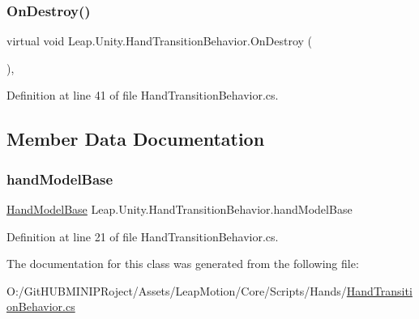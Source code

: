 \subsubsection{\texorpdfstring{OnDestroy()}{OnDestroy()}}
{\footnotesize\ttfamily virtual void Leap.\+Unity.\+Hand\+Transition\+Behavior.\+On\+Destroy (\begin{DoxyParamCaption}{ }\end{DoxyParamCaption})\hspace{0.3cm}{\ttfamily [protected]}, {\ttfamily [virtual]}}



Definition at line 41 of file Hand\+Transition\+Behavior.\+cs.



\subsection{Member Data Documentation}
\mbox{\label{class_leap_1_1_unity_1_1_hand_transition_behavior_aac308aa982a599388816ddc2d868c56e}} 
\subsubsection{\texorpdfstring{handModelBase}{handModelBase}}
{\footnotesize\ttfamily \mbox{\hyperlink{class_leap_1_1_unity_1_1_hand_model_base}{Hand\+Model\+Base}} Leap.\+Unity.\+Hand\+Transition\+Behavior.\+hand\+Model\+Base\hspace{0.3cm}{\ttfamily [protected]}}



Definition at line 21 of file Hand\+Transition\+Behavior.\+cs.



The documentation for this class was generated from the following file\+:\begin{DoxyCompactItemize}
\item 
O\+:/\+Git\+H\+U\+B\+M\+I\+N\+I\+P\+Roject/\+Assets/\+Leap\+Motion/\+Core/\+Scripts/\+Hands/\mbox{\hyperlink{_hand_transition_behavior_8cs}{Hand\+Transition\+Behavior.\+cs}}\end{DoxyCompactItemize}
